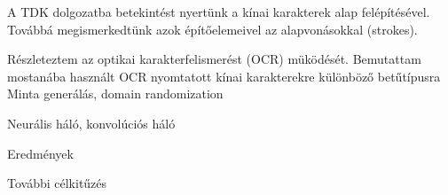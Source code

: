 
A TDK dolgozatba betekintést nyertünk a kínai karakterek alap felépítésével. Továbbá megismerkedtünk azok építőelemeivel az alapvonásokkal (strokes).

Részleteztem az optikai karakterfelismerést (OCR) müködését. Bemutattam mostanába használt OCR nyomtatott kínai karakterekre különböző betűtípusra\\

Minta generálás, domain randomization

Neurális háló, konvolúciós háló

Eredmények

További célkitűzés